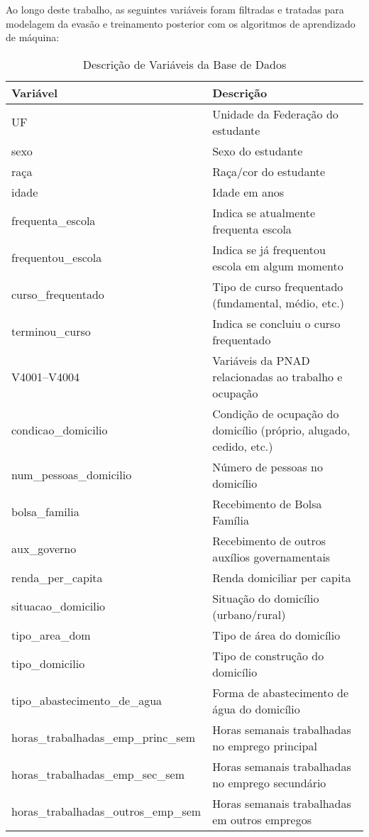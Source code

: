\documentclass[english, spanish, brazilian]{RBIEarticle} %
\begin{document}
Ao longo deste trabalho, as seguintes variáveis foram filtradas e tratadas para modelagem da evasão e treinamento posterior com os algoritmos de aprendizado de máquina:

\begin{table}
\caption{Descrição de Variáveis da Base de Dados}
\centering
\label{tab:variables}
\begin{tabular}{lp{8cm}}
\hline
Variável & Descrição \\ \hline
UF & Unidade da Federação do estudante \\
sexo & Sexo do estudante \\
raça & Raça/cor do estudante \\
idade & Idade em anos \\
frequenta\_escola & Indica se atualmente frequenta escola \\
frequentou\_escola & Indica se já frequentou escola em algum momento \\
curso\_frequentado & Tipo de curso frequentado (fundamental, médio, etc.) \\
terminou\_curso & Indica se concluiu o curso frequentado \\
V4001--V4004 & Variáveis da PNAD relacionadas ao trabalho e ocupação \\
condicao\_domicilio & Condição de ocupação do domicílio (próprio, alugado, cedido, etc.) \\
num\_pessoas\_domicilio & Número de pessoas no domicílio \\
bolsa\_familia & Recebimento de Bolsa Família \\
aux\_governo & Recebimento de outros auxílios governamentais \\
renda\_per\_capita & Renda domiciliar per capita \\
situacao\_domicilio & Situação do domicílio (urbano/rural) \\
tipo\_area\_dom & Tipo de área do domicílio \\
tipo\_domicilio & Tipo de construção do domicílio \\
tipo\_abastecimento\_de\_agua & Forma de abastecimento de água do domicílio \\
horas\_trabalhadas\_emp\_princ\_sem & Horas semanais trabalhadas no emprego principal \\
horas\_trabalhadas\_emp\_sec\_sem & Horas semanais trabalhadas no emprego secundário \\
horas\_trabalhadas\_outros\_emp\_sem & Horas semanais trabalhadas em outros empregos \\

\end{tabular}
\end{table}
\end{document}
